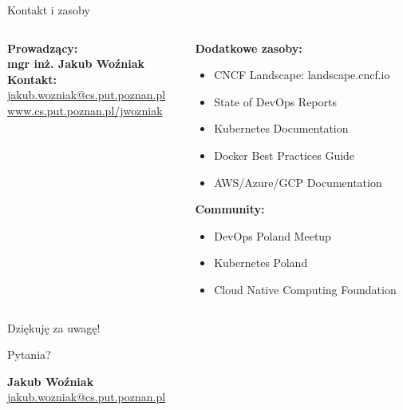 \documentclass[10pt, aspectratio=169]{beamer}
\begin{document}
\begin{frame}{Kontakt i zasoby}
\begin{columns}[T]
\begin{column}{0.5\textwidth}
\textbf{Prowadzący:}\\
\textbf{mgr inż. Jakub Woźniak}\\


\vspace{0.5cm}
\textbf{Kontakt:}\\
\href{mailto:jakub.wozniak@cs.put.poznan.pl}{jakub.wozniak@cs.put.poznan.pl}\\
\href{https://www.cs.put.poznan.pl/jwozniak}{www.cs.put.poznan.pl/jwozniak}
\end{column}
\begin{column}{0.5\textwidth}
\textbf{Dodatkowe zasoby:}
\begin{itemize}
\item CNCF Landscape: landscape.cncf.io
\item State of DevOps Reports
\item Kubernetes Documentation
\item Docker Best Practices Guide
\item AWS/Azure/GCP Documentation
\end{itemize}

\vspace{0.5cm}
\textbf{Community:}
\begin{itemize}
\item DevOps Poland Meetup
\item Kubernetes Poland
\item Cloud Native Computing Foundation
\end{itemize}
\end{column}
\end{columns}
\end{frame}

\begin{frame}
\centering
\Huge Dziękuję za uwagę!

\vspace{2cm}
\Large Pytania?

\vspace{1cm}
\normalsize
\textbf{Jakub Woźniak}\\
\href{mailto:jakub.wozniak@cs.put.poznan.pl}{jakub.wozniak@cs.put.poznan.pl}
\end{frame}
\end{document}
